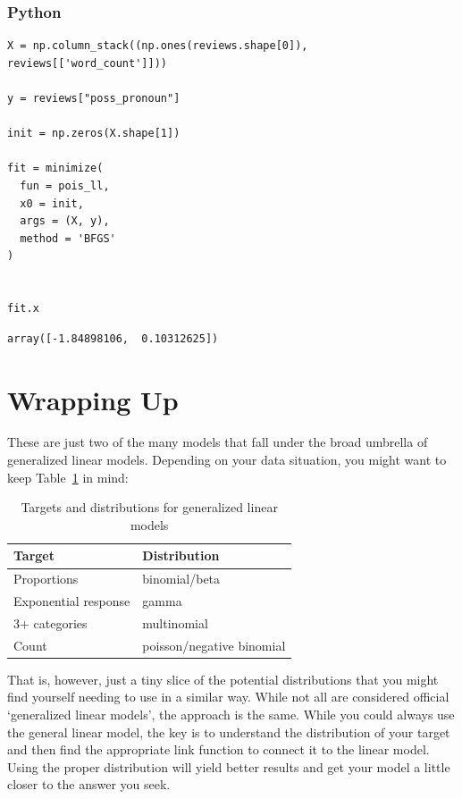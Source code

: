 \documentclass[
  letterpaper,
]{krantz}
\begin{document}
\subsubsection{Python}

\begin{verbatim}
X = np.column_stack((np.ones(reviews.shape[0]), reviews[['word_count']]))

y = reviews["poss_pronoun"]

init = np.zeros(X.shape[1])

fit = minimize(
  fun = pois_ll,
  x0 = init,
  args = (X, y),
  method = 'BFGS'
)


fit.x
\end{verbatim}

\begin{verbatim}
array([-1.84898106,  0.10312625])
\end{verbatim}

\section{Wrapping Up}\label{sec-glm-wrap}

These are just two of the many models that fall under the broad umbrella
of generalized linear models. Depending on your data situation, you
might want to keep Table~\ref{tbl-glm-models} in mind:

\begin{longtable}{ll}

\caption{\label{tbl-glm-models}Targets and distributions for generalized
linear models}

\tabularnewline

\toprule
Target & Distribution \\ 
\midrule\addlinespace[2.5pt]
Proportions & binomial/beta \\ 
Exponential response & gamma \\ 
3+ categories & multinomial \\ 
Count & poisson/negative binomial \\ 
\bottomrule

\end{longtable}

That is, however, just a tiny slice of the potential distributions that
you might find yourself needing to use in a similar way. While not all
are considered official `generalized linear models', the approach is the
same. While you could always use the general linear model, the key is to
understand the distribution of your target and then find the appropriate
link function to connect it to the linear model. Using the proper
distribution will yield better results and get your model a little
closer to the answer you seek.
\end{document}
